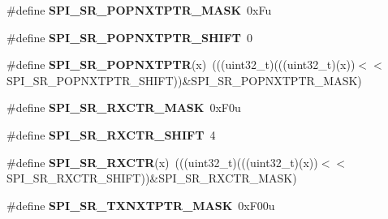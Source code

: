 \begin{DoxyCompactItemize}
\item 
\#define {\bfseries S\+P\+I\+\_\+\+S\+R\+\_\+\+P\+O\+P\+N\+X\+T\+P\+T\+R\+\_\+\+M\+A\+SK}~0x\+Fu\hypertarget{group__SPI__Register__Masks_gabf0bcd5a32bcc6e58bac1a0f826ab3c6}{}\label{group__SPI__Register__Masks_gabf0bcd5a32bcc6e58bac1a0f826ab3c6}

\item 
\#define {\bfseries S\+P\+I\+\_\+\+S\+R\+\_\+\+P\+O\+P\+N\+X\+T\+P\+T\+R\+\_\+\+S\+H\+I\+FT}~0\hypertarget{group__SPI__Register__Masks_gac1f2a81bf6d8b44020db098097c74964}{}\label{group__SPI__Register__Masks_gac1f2a81bf6d8b44020db098097c74964}

\item 
\#define {\bfseries S\+P\+I\+\_\+\+S\+R\+\_\+\+P\+O\+P\+N\+X\+T\+P\+TR}(x)~(((uint32\+\_\+t)(((uint32\+\_\+t)(x))$<$$<$S\+P\+I\+\_\+\+S\+R\+\_\+\+P\+O\+P\+N\+X\+T\+P\+T\+R\+\_\+\+S\+H\+I\+FT))\&S\+P\+I\+\_\+\+S\+R\+\_\+\+P\+O\+P\+N\+X\+T\+P\+T\+R\+\_\+\+M\+A\+SK)\hypertarget{group__SPI__Register__Masks_ga7524dc6520cf5bcea82f6d62db3a5ee8}{}\label{group__SPI__Register__Masks_ga7524dc6520cf5bcea82f6d62db3a5ee8}

\item 
\#define {\bfseries S\+P\+I\+\_\+\+S\+R\+\_\+\+R\+X\+C\+T\+R\+\_\+\+M\+A\+SK}~0x\+F0u\hypertarget{group__SPI__Register__Masks_gad70ca8db9ba4e1d62e081ef648d84752}{}\label{group__SPI__Register__Masks_gad70ca8db9ba4e1d62e081ef648d84752}

\item 
\#define {\bfseries S\+P\+I\+\_\+\+S\+R\+\_\+\+R\+X\+C\+T\+R\+\_\+\+S\+H\+I\+FT}~4\hypertarget{group__SPI__Register__Masks_gacd499785f654eb1b4d1ced2bf0b2e7ac}{}\label{group__SPI__Register__Masks_gacd499785f654eb1b4d1ced2bf0b2e7ac}

\item 
\#define {\bfseries S\+P\+I\+\_\+\+S\+R\+\_\+\+R\+X\+C\+TR}(x)~(((uint32\+\_\+t)(((uint32\+\_\+t)(x))$<$$<$S\+P\+I\+\_\+\+S\+R\+\_\+\+R\+X\+C\+T\+R\+\_\+\+S\+H\+I\+FT))\&S\+P\+I\+\_\+\+S\+R\+\_\+\+R\+X\+C\+T\+R\+\_\+\+M\+A\+SK)\hypertarget{group__SPI__Register__Masks_ga2b05bb18cd3b859747bf5bff6e0eda29}{}\label{group__SPI__Register__Masks_ga2b05bb18cd3b859747bf5bff6e0eda29}

\item 
\#define {\bfseries S\+P\+I\+\_\+\+S\+R\+\_\+\+T\+X\+N\+X\+T\+P\+T\+R\+\_\+\+M\+A\+SK}~0x\+F00u\hypertarget{group__SPI__Register__Masks_ga5526eeae29bb85218c41d8a06608acbd}{}\label{group__SPI__Register__Masks_ga5526eeae29bb85218c41d8a06608acbd}


\end{DoxyCompactItemize}
